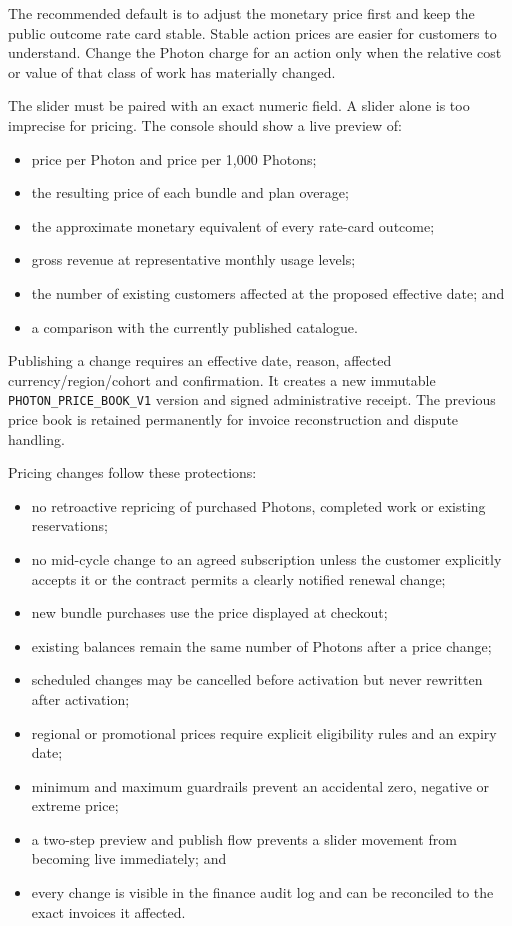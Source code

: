 \documentclass[11pt]{article}
\newcommand{\code}[1]{\texttt{#1}}
\begin{document}
The recommended default is to adjust the monetary price first and keep the public outcome rate card stable. Stable action prices are easier for customers to understand. Change the Photon charge for an action only when the relative cost or value of that class of work has materially changed.

The slider must be paired with an exact numeric field. A slider alone is too imprecise for pricing. The console should show a live preview of:

\begin{itemize}
  \item price per Photon and price per 1,000 Photons;
  \item the resulting price of each bundle and plan overage;
  \item the approximate monetary equivalent of every rate-card outcome;
  \item gross revenue at representative monthly usage levels;
  \item the number of existing customers affected at the proposed effective date; and
  \item a comparison with the currently published catalogue.
\end{itemize}

Publishing a change requires an effective date, reason, affected currency/region/cohort and confirmation. It creates a new immutable \code{PHOTON\_PRICE\_BOOK\_V1} version and signed administrative receipt. The previous price book is retained permanently for invoice reconstruction and dispute handling.

Pricing changes follow these protections:

\begin{itemize}
  \item no retroactive repricing of purchased Photons, completed work or existing reservations;
  \item no mid-cycle change to an agreed subscription unless the customer explicitly accepts it or the contract permits a clearly notified renewal change;
  \item new bundle purchases use the price displayed at checkout;
  \item existing balances remain the same number of Photons after a price change;
  \item scheduled changes may be cancelled before activation but never rewritten after activation;
  \item regional or promotional prices require explicit eligibility rules and an expiry date;
  \item minimum and maximum guardrails prevent an accidental zero, negative or extreme price;
  \item a two-step preview and publish flow prevents a slider movement from becoming live immediately; and
  \item every change is visible in the finance audit log and can be reconciled to the exact invoices it affected.
\end{itemize}
\end{document}
